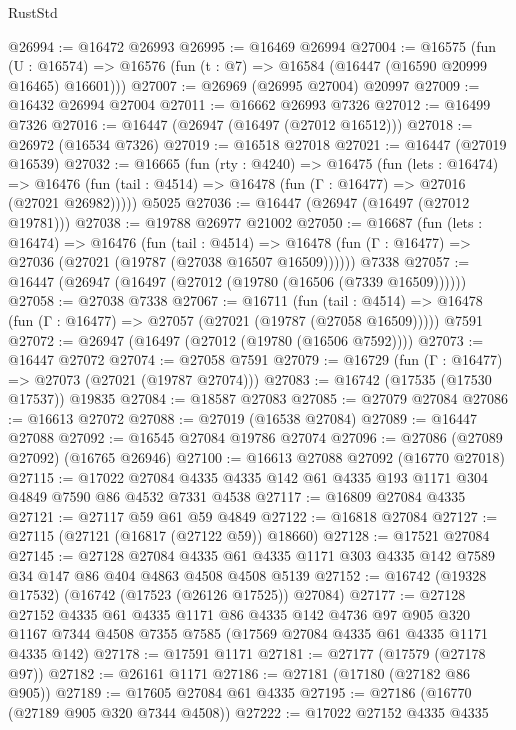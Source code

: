 \begin{lexlean}{RustStd}
\begin{coremodule}
@26994 := @16472 @26993
@26995 := @16469 @26994
@27004 := @16575
    (fun (U : @16574) => @16576 (fun (t : @7) => @16584 (@16447 (@16590 @20999 @16465) @16601)))
@27007 := @26969 (@26995 @27004) @20997
@27009 := @16432 @26994 @27004
@27011 := @16662 @26993 @7326
@27012 := @16499 @7326
@27016 := @16447 (@26947 (@16497 (@27012 @16512)))
@27018 := @26972 (@16534 @7326)
@27019 := @16518 @27018
@27021 := @16447 (@27019 @16539)
@27032 := @16665
    (fun (rty : @4240) =>
    @16475
      (fun (lets : @16474) =>
      @16476 (fun (tail : @4514) => @16478 (fun (Γ : @16477) => @27016 (@27021 @26982)))))
    @5025
@27036 := @16447 (@26947 (@16497 (@27012 @19781)))
@27038 := @19788 @26977 @21002
@27050 := @16687
    (fun (lets : @16474) =>
    @16476
      (fun (tail : @4514) =>
      @16478 (fun (Γ : @16477) => @27036 (@27021 (@19787 (@27038 @16507 @16509))))))
    @7338
@27057 := @16447 (@26947 (@16497 (@27012 (@19780 (@16506 (@7339 @16509))))))
@27058 := @27038 @7338
@27067 := @16711
    (fun (tail : @4514) => @16478 (fun (Γ : @16477) => @27057 (@27021 (@19787 (@27058 @16509)))))
    @7591
@27072 := @26947 (@16497 (@27012 (@19780 (@16506 @7592))))
@27073 := @16447 @27072
@27074 := @27058 @7591
@27079 := @16729 (fun (Γ : @16477) => @27073 (@27021 (@19787 @27074)))
@27083 := @16742 (@17535 (@17530 @17537)) @19835
@27084 := @18587 @27083
@27085 := @27079 @27084
@27086 := @16613 @27072
@27088 := @27019 (@16538 @27084)
@27089 := @16447 @27088
@27092 := @16545 @27084 @19786 @27074
@27096 := @27086 (@27089 @27092) (@16765 @26946)
@27100 := @16613 @27088 @27092 (@16770 @27018)
@27115 := @17022 @27084 @4335 @4335 @142 @61 @4335 @193 @1171 @304 @4849 @7590 @86 @4532 @7331 @4538
@27117 := @16809 @27084 @4335
@27121 := @27117 @59 @61 @59 @4849
@27122 := @16818 @27084
@27127 := @27115 (@27121 (@16817 (@27122 @59)) @18660)
@27128 := @17521 @27084
@27145 := @27128
    @27084
    @4335
    @61
    @4335
    @1171
    @303
    @4335
    @142
    @7589
    @34
    @147
    @86
    @404
    @4863
    @4508
    @4508
    @5139
@27152 := @16742 (@19328 @17532) (@16742 (@17523 (@26126 @17525)) @27084)
@27177 := @27128
    @27152
    @4335
    @61
    @4335
    @1171
    @86
    @4335
    @142
    @4736
    @97
    @905
    @320
    @1167
    @7344
    @4508
    @7355
    @7585
    (@17569 @27084 @4335 @61 @4335 @1171 @4335 @142)
@27178 := @17591 @1171
@27181 := @27177 (@17579 (@27178 @97))
@27182 := @26161 @1171
@27186 := @27181 (@17180 (@27182 @86 @905))
@27189 := @17605 @27084 @61 @4335
@27195 := @27186 (@16770 (@27189 @905 @320 @7344 @4508))
@27222 := @17022
    @27152
    @4335
    @4335

\end{coremodule}
\end{lexlean}
